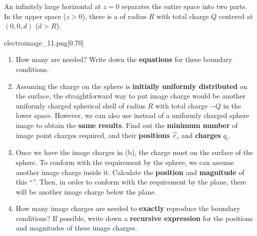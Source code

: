 \begin{example}
    An infinitely large horizontal  at $z=0$ separates the entire space into two parts. In the upper space ($z>0$), there is a  of radius $R$ with total charge $Q$ centered at $(0,0,d)$ ($d > R$).

    \begin{singlefigure}[]{electroimage_11.png}[0.70]
    \end{singlefigure}

    \begin{enumerate}[label=(\alph*)]
        \item How many  are needed? Write down the \textbf{equations} for these boundary conditions.

        \item Assuming the charge on the sphere is \textbf{initially uniformly distributed} on the surface, the straightforward way to put image charge would be another uniformly charged spherical shell of radius $R$ with total charge $-Q$ in the lower space. However, we can also use  instead of a uniformly charged sphere image to obtain the \textbf{same results}. Find out the \textbf{minimum number} of image point charges required, and their \textbf{positions} $\vec{r}_i$ and \textbf{charges} $q_i$.

        \item Once we have the image charges in (b), the charge must  on the surface of the sphere. To conform with the requirement by the sphere, we can assume another image charge inside it. Calculate the \textbf{position} and \textbf{magnitude} of this ``''. Then, in order to conform with the requirement by the plane, there will be another image charge below the plane.

        \item How many image charges are needed to \textbf{exactly} reproduce the boundary conditions? If possible, write down a \textbf{recursive expression} for the positions and magnitudes of these image charges.
    \end{enumerate}
\end{example}
